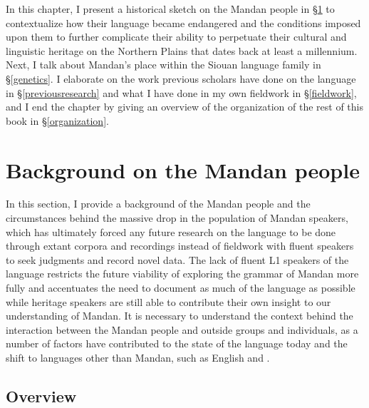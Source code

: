 In this chapter, I present a historical sketch on the Mandan people in \S\ref{background} to contextualize how their language became endangered and the conditions imposed upon them to further complicate their ability to perpetuate their cultural and linguistic heritage on the Northern Plains that dates back at least a millennium. Next, I talk about Mandan's place within the Siouan language family in \S\ref{genetics}. I elaborate on the work previous scholars have done on the language in \S\ref{previousresearch} and what I have done in my own fieldwork in \S\ref{fieldwork}, and I end the chapter by giving an overview of the organization of the rest of this book in \S\ref{organization}.

\section{Background on the Mandan people}\label{background}
\largerpage
In this section, I provide a background of the Mandan people and the circumstances behind the massive drop in the population of Mandan speakers, which has ultimately forced any future research on the language to be done through extant corpora and recordings instead of fieldwork with fluent speakers to seek judgments and record novel data. The lack of fluent L1 speakers of the language restricts the future viability of exploring the grammar of Mandan more fully and accentuates the need to document as much of the language as possible while heritage speakers are still able to contribute their own insight to our understanding of Mandan. It is necessary to understand the context behind the interaction between the Mandan people and outside groups and individuals, as a number of factors have contributed to the state of the language today and the shift to languages other than Mandan, such as English and .

\subsection{Overview}

